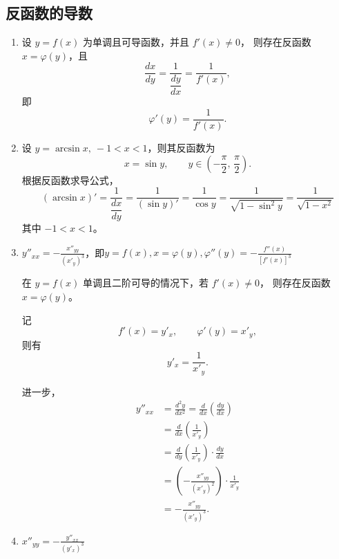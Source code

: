 \documentclass[a4paper,12pt]{article}
\begin{document}
    \subsection{反函数的导数}

    \begin{enumerate}
        \item 设 $y=f(x)$ 为单调且可导函数，并且 $f'(x)\neq 0$，
        则存在反函数 $x=\varphi(y)$，且
        \[
            \frac{dx}{dy}
            =
            \frac{1}{\dfrac{dy}{dx}}
            =
            \frac{1}{f'(x)},
        \]
        即
        \[
            \varphi'(y)=\frac{1}{f'(x)}.
        \]
        \item \begin{analysisbox}[Example]
                  设 $y = \arcsin x,\ -1 < x < 1$，则其反函数为
                  \[
                      x = \sin y,\qquad y \in \left(-\frac{\pi}{2},\,\frac{\pi}{2}\right).
                  \]
                  根据反函数求导公式，
                  \[
                      (\arcsin x)' = \frac{1}{\dfrac{dx}{dy}}
                      = \frac{1}{(\sin y)'}
                      = \frac{1}{\cos y}
                      = \frac{1}{\sqrt{1-\sin^2 y}}
                      = \frac{1}{\sqrt{1-x^2}}
                  \]
                  其中 $-1<x<1$。
        \end{analysisbox}
        \item $y''_{xx} = -\displaystyle\frac{x''_{yy}}{(x'_y)^3}$，即$y = f(x), x = \varphi (y), \varphi''(y) = -\displaystyle\frac{f''(x)}{[f'(x)]^3}$
        \begin{analysisbox}
            在 $y=f(x)$ 单调且二阶可导的情况下，若 $f'(x)\neq 0$，
            则存在反函数 $x=\varphi(y)$。

            记
            \[
                f'(x)=y'_x,\qquad \varphi'(y)=x'_y,
            \]
            则有
            \[
                y'_x=\frac{1}{x'_y}.
            \]

            进一步，
            \[
                \begin{aligned}
                    y''_{xx}
                    &=\frac{d^2y}{dx^2} = \frac{d}{dx}\!\left(\frac{dy}{dx}\right) \\[6pt]
                    &=\frac{d}{dx}\!\left(\frac{1}{x'_y}\right) \\[6pt]
                    &=\frac{d}{dy}\!\left(\frac{1}{x'_y}\right)\cdot\frac{dy}{dx} \\[6pt]
                    &=\left(-\frac{x''_{yy}}{(x'_y)^2}\right)\cdot\frac{1}{x'_y} \\[6pt]
                    &=-\frac{x''_{yy}}{(x'_y)^3}.
                \end{aligned}
            \]
        \end{analysisbox}
        \item $x''_{yy} = -\displaystyle\frac{y''_{xx}}{(y'_x)^3}$
    \end{enumerate}
\end{document}

